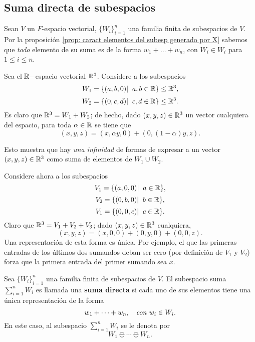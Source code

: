 \subsection{Suma directa de subespacios}

Sean $V$ un $F$-espacio vectorial, 
$\{ W_{i} \}_{i=1}^{n}$ una familia finita de subespacios
de $V$. Por la proposición 
\ref{prop: caract elementos del subesp generado por X}
sabemos que \textit{todo} elemento de 
su suma es de la forma 
$w_{1} + \ldots + w_{n}$, con $W_{i} \in W_{i}$ para
$1 \leq i \leq n$.

\begin{ejem}
Sea el $\mathbb{R}-$espacio vectorial $\mathbb{R}^{3}$. Considere a los subespacios
\[
W_{1} = \{ (a, b, 0)  | \hspace{0.2cm} a, b \in \mathbb{R} \}
\leq \mathbb{R}^{3},
\]
\[
W_{2} = \{ (0, c, d)  | \hspace{0.2cm} c, d \in \mathbb{R} \}
\leq \mathbb{R}^{3}.
\]
Es claro que $\mathbb{R}^{3} = W_{1} + W_{2}$; de hecho, dado
$(x, y, z) \in \mathbb{R}^{3}$ un vector cualquiera del espacio, 
para toda $\alpha \in \mathbb{R}$ se tiene que
\begin{equation}
	\label{eq: 1, 21 Ag}
	(x, y, z) = (x, \alpha y, 0) + 
(0, (1-\alpha)y, z).
\end{equation}

Esto muestra que hay \textit{una infinidad} de formas
de expresar a un 
vector $(x, y, z) \in \mathbb{R}^{3}$ como suma
de elementos de $W_{1} \cup W_{2}$.

Considere ahora a los subespacios
\[
V_{1} = \{ (a, 0, 0)  | \hspace{0.2cm} a\in \mathbb{R} \},
\]
\[
V_{2} = \{ (0, b, 0)  | \hspace{0.2cm} b\in \mathbb{R} \},
\]
\[
V_{1} = \{ (0, 0, c)  | \hspace{0.2cm} c\in \mathbb{R} \}.
\]
Claro que $\mathbb{R}^{3} = V_{1} + V_{2} + V_{3}$; dado
$(x, y, z) \in \mathbb{R}^{3}$ cualquiera,
\[
(x, y, z) = (x, 0, 0) + (0, y, 0) + (0, 0, z).
\]
Una representación de esta forma es única. Por ejemplo,
el que las primeras entradas de los últimos dos sumandos
deban ser cero (por definición de $V_{1}$ y $V_{2}$)
forza que la primera entrada del primer sumando sea $x$.
\diam
\end{ejem}

\begin{defi}
Sea $\{ W_{i} \}_{i=1}^{n}$ una familia finita de subespacios
de $V$. 
El subespacio suma $\sum_{i=1}^{n} W_{i}$
es llamada una \textbf{suma directa} si cada uno de sus
elementos tiene una única representación de la forma
\[
w_{1} + \cdots  + w_{n}, 
\hspace{0.2cm} \textit{ con }
w_{i} \in W_{i}.
\]
En este caso, al subespacio $\sum_{i=1}^{n}W_{i}$
se le denota por
\[
W_{1} \oplus \cdots \oplus W_{n}.
\]
\end{defi}

